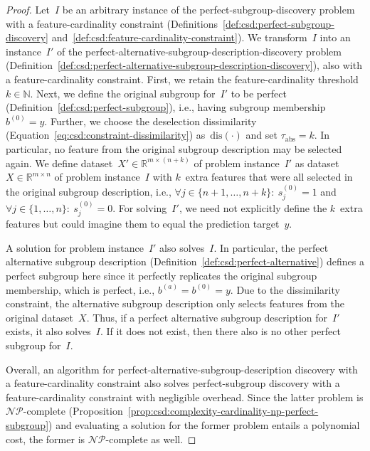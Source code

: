 \documentclass[acmsmall]{acmart} %
\theoremstyle{acmplain}
\theoremstyle{acmdefinition}
\begin{document}
%
\begin{proof}
	Let~$I$ be an arbitrary instance of the perfect-subgroup-discovery problem with a feature-cardinality constraint (Definitions~\ref{def:csd:perfect-subgroup-discovery} and~\ref{def:csd:feature-cardinality-constraint}).	
	We transform~$I$ into an instance~$I'$ of the perfect-alternative-subgroup-description-discovery problem (Definition~\ref{def:csd:perfect-alternative-subgroup-description-discovery}), also with a feature-cardinality constraint.
	First, we retain the feature-cardinality threshold~$k \in \mathbb{N}$.
	Next, we define the original subgroup for~$I'$ to be perfect (Definition~\ref{def:csd:perfect-subgroup}), i.e., having subgroup membership $b^{(0)} = y$.
	Further, we choose the deselection dissimilarity (Equation~\ref{eq:csd:constraint-dissimilarity}) as~$\text{dis}(\cdot)$ and set $\tau_{\text{abs}} = k$.
	In particular, no feature from the original subgroup description may be selected again.
	We define dataset~$X' \in \mathbb{R}^{m \times (n+k)}$ of problem instance~$I'$ as dataset~$X \in \mathbb{R}^{m \times n}$ of problem instance~$I$ with $k$~extra features that were all selected in the original subgroup description, i.e., $\forall j \in \{n+1, \dots, n+k\}:~ s^{(0)}_j = 1$ and $\forall j \in \{1, \dots, n\}:~s^{(0)}_j = 0$.
	For solving~$I'$, we need not explicitly define the $k$~extra features but could imagine them to equal the prediction target~$y$.
	
	A solution for problem instance~$I'$ also solves~$I$.
	In particular, the perfect alternative subgroup description (Definition~\ref{def:csd:perfect-alternative}) defines a perfect subgroup here since it perfectly replicates the original subgroup membership, which is perfect, i.e., $b^{(a)} = b^{(0)} = y$.
	Due to the dissimilarity constraint, the alternative subgroup description only selects features from the original dataset~$X$.
	Thus, if a perfect alternative subgroup description for~$I'$ exists, it also solves~$I$.
	If it does not exist, then there also is no other perfect subgroup for~$I$.

	Overall, an algorithm for perfect-alternative-subgroup-description discovery with a feature-cardinality constraint also solves perfect-subgroup discovery with a feature-cardinality constraint with negligible overhead.
	Since the latter problem is $\mathcal{NP}$-complete (Proposition~\ref{prop:csd:complexity-cardinality-np-perfect-subgroup}) and evaluating a solution for the former problem entails a polynomial cost, the former is $\mathcal{NP}$-complete as well.
\end{proof}
\end{document}
